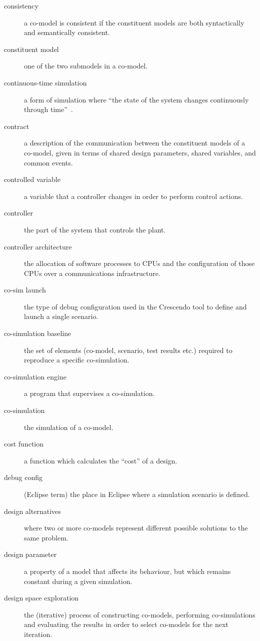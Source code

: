 \documentclass{crescendorepchap}
\begin{document}
\begin{description}
\item[consistency] a co-model is consistent if the constituent models are both syntactically and semantically consistent.
\item[constituent model] one of the two submodels in a co-model.
\item[continuous-time simulation] a form of simulation where ``the state of the system changes continuously through time''~\cite[p.~15]{Robinson04}.
\item[contract] a description of the communication between the constituent models of a co-model, given in terms of shared design parameters, shared variables, and common events.
\item[controlled variable] a variable that a controller changes in order to perform control actions.
\item[controller] the part of the system that controls the plant.
\item[controller architecture] the allocation of software processes to CPUs and the configuration of those CPUs over a communications infrastructure.
\item[co-sim launch] the type of debug configuration used in the Crescendo tool to define and launch a single scenario.
\item[co-simulation baseline] the set of elements (co-model, scenario, test results etc.) required to reproduce a specific co-simulation.
\item[co-simulation engine] a program that supervises a co-simulation.
\item[co-simulation] the simulation of a co-model.
\item[cost function] a function which calculates the ``cost'' of a design.
\item[debug config] (Eclipse term) the place in Eclipse where a simulation scenario is defined.
\item[design alternatives] where two or more co-models represent different possible solutions to the same problem.
\item[design parameter] a property of a model that affects its behaviour, but which remains constant during a given simulation.
\item[design space exploration] the (iterative) process of constructing co-models, performing co-simulations and evaluating the results in order to select co-models for the next iteration.

\end{description}
\end{document}

